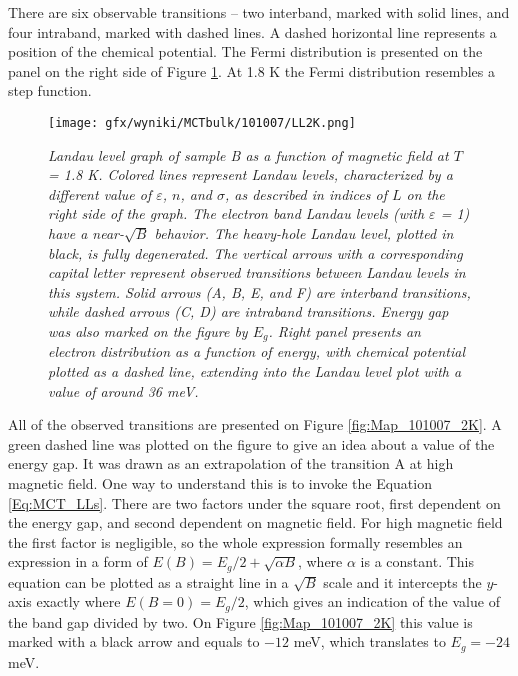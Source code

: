 \documentclass[titlepage,a4paper]{book}
\begin{document}
There are six observable transitions -- two interband, marked with solid lines, and four intraband, marked with dashed lines. A dashed horizontal line represents a position of the chemical potential. The Fermi distribution is presented on the panel on the right side of Figure \ref{fig:LL_101007_2K}. At 1.8 K the Fermi distribution resembles a step function.

\begin{figure}[ht]
	\centering
	\texttt{[image: gfx/wyniki/MCTbulk/101007/LL2K.png]}
	\vspace{-10pt}
	\caption{\textit{Landau level graph of sample B as a function of magnetic field at $T$ = 1.8 K. Colored lines represent Landau levels, characterized by a different value of $\varepsilon$, $n$, and $\sigma$, as described in indices of $L$ on the right side of the graph. The electron band Landau levels (with $\varepsilon$ = 1) have a near-$\sqrt{B}$ behavior. The heavy-hole Landau level, plotted in black, is fully degenerated. The vertical arrows with a corresponding capital letter represent observed transitions between Landau levels in this system. Solid arrows (A, B, E, and F) are interband transitions, while dashed arrows (C, D) are intraband transitions. Energy gap was also marked on the figure by $E_g$. Right panel presents an electron distribution as a function of energy, with chemical potential plotted as a dashed line, extending into the Landau level plot with a value of around 36 meV.}}
	\label{fig:LL_101007_2K}
\end{figure}

All of the observed transitions are presented on Figure \ref{fig:Map_101007_2K}. A green dashed line was plotted on the figure to give an idea about a value of the energy gap. It was drawn as an extrapolation of the transition A at high magnetic field. One way to understand this is to invoke the Equation \ref{Eq:MCT_LLs}. There are two factors under the square root, first dependent on the energy gap, and second dependent on magnetic field. For high magnetic field the first factor is negligible, so the whole expression formally resembles an expression in a form of $E(B) = E_g/2 + \sqrt{\alpha B} $, where $\alpha$ is a constant. This equation can be plotted as a straight line in a $\sqrt{B}$ scale and it intercepts the $y$-axis exactly where $E(B = 0) = E_g/2$, which gives an indication of the value of the band gap divided by two. On Figure \ref{fig:Map_101007_2K} this value is marked with a black arrow and equals to $-12$ meV, which translates to $E_g = -24$ meV.
\end{document}
